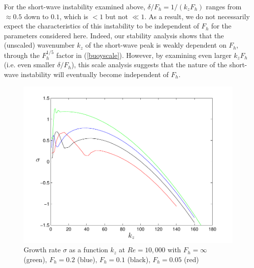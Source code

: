 For the short-wave instability examined above, $\delta/F_{h}=1/(k_{z}F_{h})$ ranges from $\approx 0.5$ down to $0.1$, which is $<1$ but not $\ll 1$. As a result, we do not necessarily expect the characteristics of this instability to be independent of $F_{h}$ for the parameters considered here. Indeed, our stability analysis shows that the (unscaled) wavenumber $k_{z}$ of the short-wave peak is weakly dependent on $F_{h}$, through the $F_{h}^{1/5}$ factor in (\ref{buoyscale}). However, by examining even larger $k_{z}F_{h}$ (i.e. even smaller $\delta/F_{h}$), this scale analysis suggests that the nature of the short-wave instability will eventually become independent of $F_{h}$.  

\begin{figure}
\begin{center}
\includegraphics[scale=0.7]{sigma_kz_scaling}
\caption{Growth rate $\sigma$ as a function $k_{z}$ at $Re=10{,}000$ with $F_{h}=\infty$ (green), $F_{h}=0.2$ (blue), $F_{h}=0.1$ (black), $F_{h}=0.05$ (red)}
\label{sigma_scaling}
\end{center}
\end{figure}


